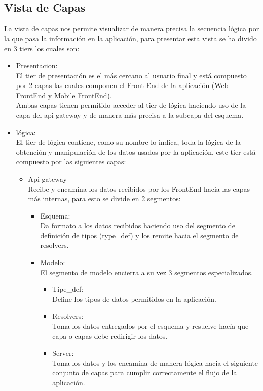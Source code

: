 \subsection{Vista de Capas}
La vista de capas nos permite visualizar de manera precisa la secuencia lógica por la que pasa la información en la aplicación, para presentar esta vista se ha divido en 3 tiers los cuales son:\\

\begin{itemize}
    \item Presentacion: \\
    El tier de presentación es el más cercano al usuario final y está compuesto por 2 capas las cuales componen el Front End de la aplicación (Web FrontEnd y Mobile FrontEnd). \\
    Ambas capas tienen permitido acceder al tier de lógica haciendo uso de la capa del api-gateway y de manera más precisa a la subcapa del esquema.
    
    \item lógica: \\
    El tier  de lógica contiene, como su nombre lo indica, toda la lógica de la obtención y manipulación de los datos usados por la aplicación, este tier está compuesto por las siguientes capas: \\
    \begin{itemize}
        \item Api-gateway \\
        Recibe y encamina los datos recibidos por los FrontEnd hacia las capas más internas, para esto se divide en 2 segmentos: 
        
        \begin{itemize}
            \item Esquema: \\
            Da formato a los datos recibidos haciendo uso del segmento de definición de tipos (type\_def) y los remite hacia el segmento de resolvers. 
            \item Modelo: \\
            El segmento de modelo encierra a su vez 3 segmentos especializados.
            \begin{itemize}
                \item Tipe\_def:\\
                Define los tipos de datos permitidos en la aplicación.
                \item Resolvers:\\
                Toma los datos entregados por el esquema y resuelve hacía que capa o capas debe redirigir los datos.
                \item Server:\\
                Toma los datos y los encamina de manera lógica hacia el siguiente conjunto de capas para cumplir correctamente el flujo de la aplicación.
            \end{itemize}
        \end{itemize}
        

\end{itemize}
\end{itemize}
